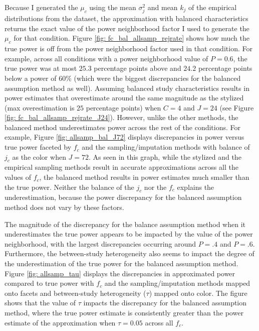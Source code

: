 Because I generated the $\mu_c$ using the mean $\sigma_j^2$ and mean $k_j$ of the empirical distributions from the \textcite{WilliamsRyan2022HiMI} dataset, the approximation with balanced characteristics returns the exact value of the power neighborhood factor I used to generate the $\mu_c$ for that condition. Figure \ref{fig: fc_bal_allsamp_rejrate} shows how much the true power is off from the power neighborhood factor used in that condition. For example, across all conditions with a power neighborhood value of $P = 0.6$, the true power was at most $25.3$ percentage points above and $24.2$ percentage points below a power of $60\%$ (which were the biggest discrepancies for the balanced assumption method as well). Assuming balanced study characteristics results in power estimates that overestimate around the same magnitude as the stylized (max overestimation is $25$ percentage points) when $C=4$ and $J=24$ (see Figure \ref{fig: fc_bal_allsamp_rejrate_J24}). However, unlike the other methods, the balanced method underestimates power across the rest of the conditions. For example, Figure \ref{fig: allsamp_bal_J72} displays discrepancies in power versus true power faceted by $f_c$ and the sampling/imputation methods with balance of $j_c$ as the color when $J=72$. As seen in this graph, while the stylized and the empirical sampling methods result in accurate approximations across all the values of $f_c$, the balanced method results in power estimates much smaller than the true power.  Neither the balance of the $j_c$ nor the $f_c$ explains the underestimation, because the power discrepancy for the balanced assumption method does not vary by these factors. 

The magnitude of the discrepancy for the balance assumption method when it underestimates the true power appears to be impacted by the value of the power neighborhood, with the largest discrepancies occurring around $P = .4$ and $P = .6$. Furthermore, the between-study heterogeneity also seems to impact the degree of the underestimation of the true power for the balanced assumption method. Figure \ref{fig: allsamp_tau} displays the discrepancies in approximated power compared to true power with $f_c$ and the sampling/imputation methods mapped onto facets and between-study heterogeneity ($\tau$) mapped onto color. The figure shows that the value of $\tau$ impacts the discrepancy for the balanced assumption method, where the true power estimate is consistently greater than the power estimate of the approximation when $\tau = 0.05$ across all $f_c$.


